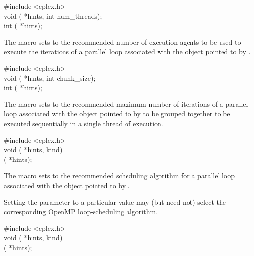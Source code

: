 \begin{ttfamily}
\#include <cplex.h>\\
void ( *hints, int num_threads);\\
int ( *hints);
\end{ttfamily}

\pnum
The
macro sets to
the recommended number of execution agents to be used
to execute the iterations of a parallel loop
associated with the object pointed to by
.

\begin{ttfamily}
\#include <cplex.h>\\
void ( *hints, int chunk_size);\\
int ( *hints);
\end{ttfamily}

\pnum
The
macro sets to
the recommended maximum number of iterations
of a parallel loop associated with the object pointed to by
to be grouped together to be executed sequentially
in a single thread of execution.

\begin{ttfamily}
\#include <cplex.h>\\
void ( *hints,  kind);\\
 ( *hints);
\end{ttfamily}

\pnum
The
macro sets to
the recommended scheduling algorithm
for a parallel loop associated with the object pointed to by
.

\begin{note}
Setting the
parameter to a particular value
may (but need not)
select the corresponding OpenMP loop-scheduling algorithm.
\end{note}

\begin{ttfamily}
\#include <cplex.h>\\
void ( *hints,  kind);\\
 ( *hints);
\end{ttfamily}

